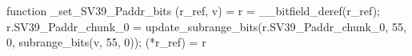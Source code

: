 function _set_SV39_Paddr_bits (r_ref, v) = {
    r = __bitfield_deref(r_ref);
    r.SV39_Paddr_chunk_0 = update_subrange_bits(r.SV39_Paddr_chunk_0, 55, 0, subrange_bits(v, 55, 0));
    (*r_ref) = r
}
